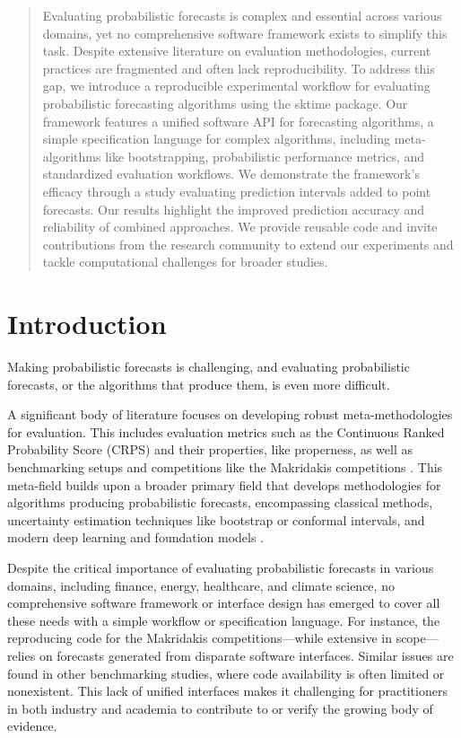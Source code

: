 
\begin{abstract}
Evaluating probabilistic forecasts is complex and essential across various domains, yet no comprehensive software framework exists to simplify this task. Despite extensive literature on evaluation methodologies, current practices are fragmented and often lack reproducibility. To address this gap, we introduce a reproducible experimental workflow for evaluating probabilistic forecasting algorithms using the sktime package. Our framework features a unified software API for forecasting algorithms, a simple specification language for complex algorithms, including meta-algorithms like bootstrapping, probabilistic performance metrics, and standardized evaluation workflows. We demonstrate the framework's efficacy through a study evaluating prediction intervals added to point forecasts. Our results highlight the improved prediction accuracy and reliability of combined approaches. We provide reusable code and invite contributions from the research community to extend our experiments and tackle computational challenges for broader studies.

\end{abstract}

\section{Introduction}\label{introduction}
Making probabilistic forecasts is challenging, and evaluating probabilistic forecasts, or the algorithms that produce them, is even more difficult. 

A significant body of literature focuses on developing robust meta-methodologies for evaluation. This includes evaluation metrics such as the Continuous Ranked Probability Score (CRPS) \cite{gneiting2014probabilistic} and their properties, like properness, as well as benchmarking setups and competitions like the Makridakis competitions \cite{makridakis2020_m4, makridakis2022_m5}. This meta-field builds upon a broader primary field that develops methodologies for algorithms producing probabilistic forecasts, encompassing classical methods, uncertainty estimation techniques like bootstrap or conformal intervals, and modern deep learning and foundation models \cite{chen2020probabilistic, nowotarski2018probabilistic, lagllama, decoder_foundation_forecasting}.

Despite the critical importance of evaluating probabilistic forecasts in various domains, including finance, energy, healthcare, and climate science, no comprehensive software framework or interface design has emerged to cover all these needs with a simple workflow or specification language. For instance, the reproducing code for the Makridakis competitions—while extensive in scope—relies on forecasts generated from disparate software interfaces. Similar issues are found in other benchmarking studies, where code availability is often limited or nonexistent. This lack of unified interfaces makes it challenging for practitioners in both industry and academia to contribute to or verify the growing body of evidence.

